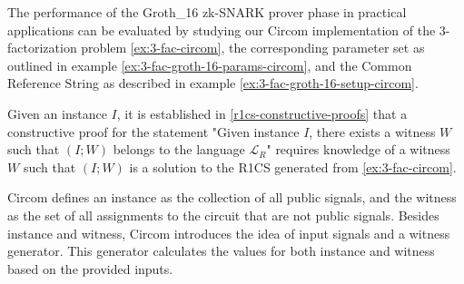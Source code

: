 \begin{example}
\label{ex:3-fac-groth-16-prover-circom} The performance of the Groth\_16 zk-SNARK prover phase in practical applications can be evaluated by studying our Circom implementation of the $3$-factorization problem \ref{ex:3-fac-circom}, the corresponding parameter set as outlined in example \ref{ex:3-fac-groth-16-params-circom}, and the Common Reference String as described in example \ref{ex:3-fac-groth-16-setup-circom}.

Given an instance $I$, it is established in \ref{r1cs-constructive-proofs} that a constructive proof for the statement "Given instance $I$, there exists a witness $W$ such that $(I;W)$ belongs to the language $\mathcal{L}_R$" requires knowledge of a witness $W$ such that $(I;W)$ is a solution to the R1CS generated from \ref{ex:3-fac-circom}.

Circom defines an instance as the collection of all public signals, and the witness as the set of all assignments to the circuit that are not public signals. Besides instance and witness, Circom introduces the idea of input signals and a witness generator. This generator calculates the values for both instance and witness based on the provided inputs.


\end{example}
